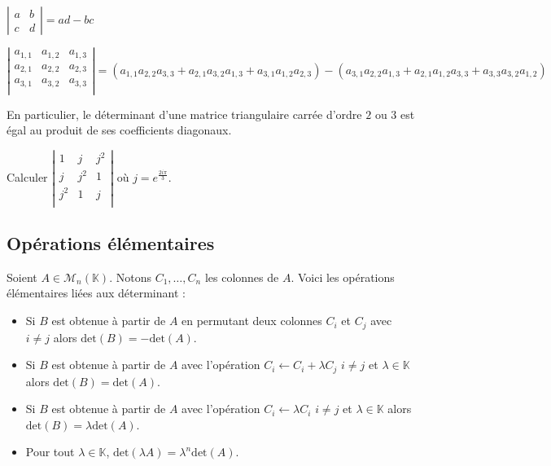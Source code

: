 \documentclass[a4paper,10pt]{report}
\begin{document}
\begin{prop} $\left\vert \begin{array}{cc}
a & b \\
c & d
\end{array} \right\vert = ad-bc$
\end{prop}

\begin{prop}

$$\left\vert \begin{array}{ccc}
a_{1,1} & a_{1,2} & a_{1,3} \\
a_{2,1} & a_{2,2} & a_{2,3} \\
a_{3,1} & a_{3,2} & a_{3,3} \\
\end{array} \right\vert =  (a_{1,1}a_{2,2} a_{3,3} +  a_{2,1}a_{3,2}a_{1,3} + a_{3,1}a_{1,2}a_{2,3}) - (a_{3,1}a_{2,2}a_{1,3} + a_{2,1} a_{1,2} a_{3,3} + a_{3,3} a_{3,2} a_{1,2} ) $$
\end{prop}

\begin{rem} En particulier, le déterminant d'une matrice triangulaire carrée d'ordre $2$ ou $3$ est égal au produit de ses coefficients diagonaux.
\end{rem}

\begin{exa} Calculer $\left\vert \begin{array}{ccc}
1 & j & j^2 \\
j & j^2& 1 \\
j^2 & 1 & j \\
\end{array}\right\vert$ où $j=e^{\frac{2i\pi}{3}}$.
\end{exa}

\subsection{Opérations élémentaires}

\noindent Soient $A \in \mathcal{M}_n(\mathbb{K})$. Notons $C_1, \ldots, C_n$ les colonnes de $A$. Voici les opérations élémentaires liées aux déterminant :

\begin{itemize}
\item Si $B$ est obtenue à partir de $A$ en permutant deux colonnes $C_i$ et $C_j$ avec $i \neq j$ alors $\textrm{det}(B) = - \textrm{det}(A)$.
\item Si $B$ est obtenue à partir de $A$ avec l'opération $C_i \leftarrow C_i + \lambda C_j$ $i \neq j$ et $\lambda \in \mathbb{K}$ alors $\textrm{det}(B) = \textrm{det}(A)$.
\item Si $B$ est obtenue à partir de $A$ avec l'opération $C_i \leftarrow \lambda C_i$ $i \neq j$ et $\lambda \in \mathbb{K}$ alors $\textrm{det}(B) = \lambda\textrm{det}(A)$.
\item Pour tout $\lambda \in \mathbb{K}$, $\textrm{det}(\lambda A) = \lambda^n \textrm{det}(A)$.
\end{itemize}
\end{document}
